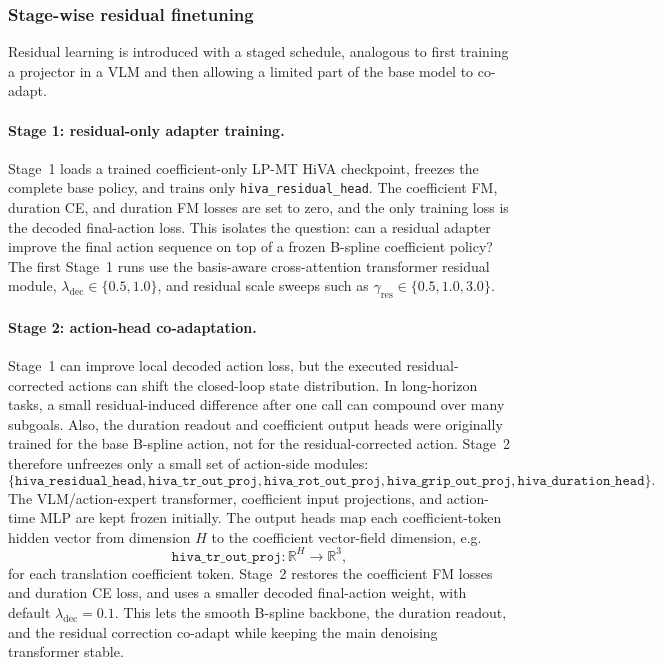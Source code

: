\documentclass[10pt,twocolumn,letterpaper]{article}
\begin{document}
\subsubsection*{Stage-wise residual finetuning}
Residual learning is introduced with a staged schedule, analogous to first training a projector in a VLM and then allowing a limited part of the base model to co-adapt.

\paragraph{Stage 1: residual-only adapter training.}
Stage~1 loads a trained coefficient-only LP-MT HiVA checkpoint, freezes the complete base policy, and trains only \texttt{hiva\_residual\_head}. The coefficient FM, duration CE, and duration FM losses are set to zero, and the only training loss is the decoded final-action loss. This isolates the question: can a residual adapter improve the final action sequence on top of a frozen B-spline coefficient policy? The first Stage~1 runs use the basis-aware cross-attention transformer residual module, $\lambda_{\mathrm{dec}}\in\{0.5,1.0\}$, and residual scale sweeps such as $\gamma_{\mathrm{res}}\in\{0.5,1.0,3.0\}$.

\paragraph{Stage 2: action-head co-adaptation.}
Stage~1 can improve local decoded action loss, but the executed residual-corrected actions can shift the closed-loop state distribution. In long-horizon tasks, a small residual-induced difference after one call can compound over many subgoals. Also, the duration readout and coefficient output heads were originally trained for the base B-spline action, not for the residual-corrected action. Stage~2 therefore unfreezes only a small set of action-side modules:
\begin{equation}
\{\texttt{hiva\_residual\_head},
\texttt{hiva\_tr\_out\_proj},
\texttt{hiva\_rot\_out\_proj},
\texttt{hiva\_grip\_out\_proj},
\texttt{hiva\_duration\_head}\}.
\end{equation}
The VLM/action-expert transformer, coefficient input projections, and action-time MLP are kept frozen initially. The output heads map each coefficient-token hidden vector from dimension $H$ to the coefficient vector-field dimension, e.g.
\begin{equation}
\texttt{hiva\_tr\_out\_proj}:\mathbb{R}^{H}\rightarrow\mathbb{R}^{3},
\end{equation}
for each translation coefficient token. Stage~2 restores the coefficient FM losses and duration CE loss, and uses a smaller decoded final-action weight, with default $\lambda_{\mathrm{dec}}=0.1$. This lets the smooth B-spline backbone, the duration readout, and the residual correction co-adapt while keeping the main denoising transformer stable.
\end{document}
